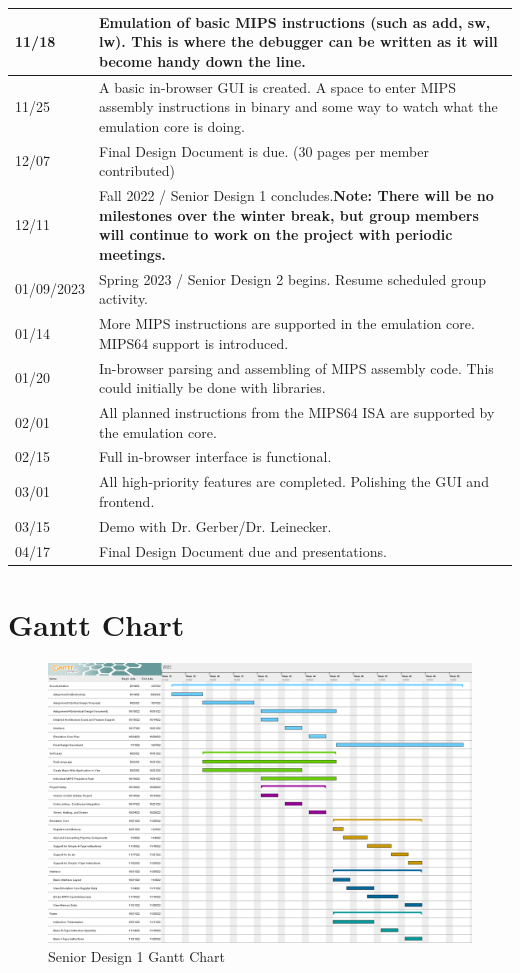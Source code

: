 \documentclass[parskip=half, fontsize=12pt]{scrartcl}
\begin{document}
\begin{longtable}{| p{} | p{} |}
    11/18 & Emulation of basic MIPS instructions (such as add, sw, lw). This is where the debugger can be written as it will become handy down the line.\\\hline
    11/25 & A basic in-browser GUI is created. A space to enter MIPS assembly instructions in binary and some way to watch what the emulation core is doing.\\\hline
    12/07 & Final Design Document is due. (30 pages per member contributed)\\\hline
    12/11 & Fall 2022 / Senior Design 1 concludes.\newline \textbf{Note: There will be no milestones over the winter break, but group members will continue to work on the project with periodic meetings.}\\\hline
    01/09/2023 & Spring 2023 / Senior Design 2 begins. Resume scheduled group activity.\\\hline
    01/14 & More MIPS instructions are supported in the emulation core. MIPS64 support is introduced.\\\hline
    01/20 & In-browser parsing and assembling of MIPS assembly code. This could initially be done with libraries.\\\hline
    02/01 & All planned instructions from the MIPS64 ISA are supported by the emulation core.\\\hline
    02/15 & Full in-browser interface is functional.\\\hline
    03/01 & All high-priority features are completed. Polishing the GUI and frontend.\\\hline
    03/15 & Demo with Dr. Gerber/Dr. Leinecker.\\\hline
    04/17 & Final Design Document due and presentations.\\\hline
\end{longtable}



\section{Gantt Chart}
\begin{figure}[H]
    \centering
    \includegraphics[width=\textwidth]{gantt-sd1}
    \caption{Senior Design 1 Gantt Chart}
\end{figure}
\end{document}
